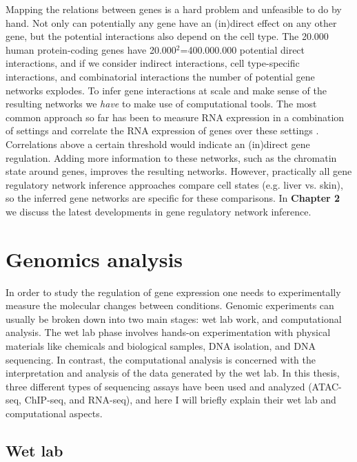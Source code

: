 Mapping the relations between genes is a hard problem and unfeasible to do by hand. Not only can potentially any gene have an (in)direct effect on any other gene, but the potential interactions also depend on the cell type. The 20.000 human protein-coding genes have 20.000$^2$=400.000.000 potential direct interactions, and if we consider indirect interactions, cell type-specific interactions, and combinatorial interactions the number of potential gene networks explodes. To infer gene interactions at scale and make sense of the resulting networks we \textit{have} to make use of computational tools. The most common approach so far has been to measure RNA expression in a combination of settings and correlate the RNA expression of genes over these settings \cite{Zhang_2005,Margolin_2006}. Correlations above a certain threshold would indicate an (in)direct gene regulation. Adding more information to these networks, such as the chromatin state around genes\cite{Xu_2020,Kamal_2021}, improves the resulting networks. However, practically all gene regulatory network inference approaches compare cell states (e.g. liver vs. skin), so the inferred gene networks are specific for these comparisons. In \textbf{Chapter 2} we discuss the latest developments in gene regulatory network inference.

\section{Genomics analysis}

In order to study the regulation of gene expression one needs to experimentally measure the molecular changes between conditions. Genomic experiments can usually be broken down into two main stages: wet lab work,  and computational analysis. The wet lab phase involves hands-on experimentation with physical materials like chemicals and biological samples, DNA isolation, and DNA sequencing. In contrast, the computational analysis is concerned with the interpretation and analysis of the data generated by the wet lab.  In this thesis, three different types of sequencing assays have been used and analyzed (ATAC-seq, ChIP-seq, and RNA-seq), and here I will briefly explain their wet lab and computational aspects. 

\subsection{Wet lab}

